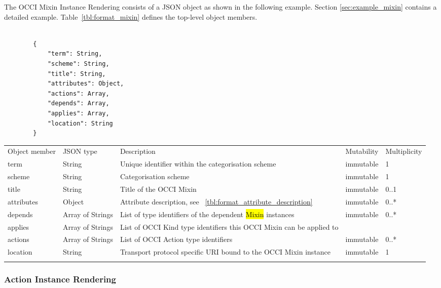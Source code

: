 \documentclass[10pt,a4paper]{article}
\begin{document}
The OCCI Mixin Instance Rendering consists of a JSON object as shown in the following example. Section \ref{sec:example_mixin} contains a detailed example.
Table~\ref{tbl:format_mixin} defines the top-level object members.

\begin{lstlisting}

        {
            "term": String,
            "scheme": String,
            "title": String,
            "attributes": Object,
            "actions": Array,
            "depends": Array,
            "applies": Array,
            "location": String
        }

\end{lstlisting}

 {
    \begin{tabularx}{\textwidth}{llXll}
    \toprule
    Object member & JSON type & Description & Mutability & Multiplicity \\
    \colrule
    term & String & Unique identifier within the categorisation scheme &
immutable & 1 \\

    scheme & String & Categorisation scheme & immutable & 1 \\
    
    title & String & Title of the OCCI Mixin & immutable & 0..1 \\
    
    attributes & Object & Attribute description, see
~\ref{tbl:format_attribute_description} & immutable & 0..* \\

    depends & Array of Strings & List of type identifiers of the dependent
 \hl{Mixin} instances & immutable & 0..* \\
 
    applies & Array of Strings & List of OCCI Kind type identifiers this OCCI 
Mixin can be applied to \\

    actions & Array of Strings & List of OCCI Action type identifiers
& immutable & 0..* \\

    location & String & Transport protocol specific URI bound to the OCCI Mixin
instance & immutable & 1 \\
    \botrule
    \end{tabularx}
}

\subsubsection{Action Instance Rendering}
\label{sec:format_action}
\end{document}
